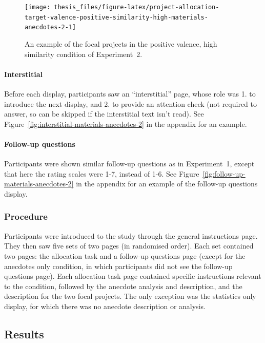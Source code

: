 \documentclass[a4paper, nobind, dvipsnames]{templates/ociamthesis}
\theoremstyle{definition}
\theoremstyle{definition}
\theoremstyle{definition}
\theoremstyle{definition}
\theoremstyle{remark}
\begin{document}
\begin{figure}
\texttt{[image: thesis\_files/figure-latex/project-allocation-target-valence-positive-similarity-high-materials-anecdotes-2-1]} \caption{An example of the focal projects in the positive valence, high similarity condition of Experiment~2.}\label{fig:project-allocation-target-valence-positive-similarity-high-materials-anecdotes-2}
\end{figure}

\paragraph{Interstitial}

Before each display, participants saw an ``interstitial'' page, whose role was 1.
to introduce the next display, and 2. to provide an attention check (not
required to answer, so can be skipped if the interstitial text isn't read). See
Figure~\ref{fig:interstitial-materials-anecdotes-2} in the appendix for an
example.

\paragraph{Follow-up questions}

Participants were shown similar follow-up questions as in Experiment~1, except
that here the rating scales were 1-7, instead of 1-6. See
Figure~\ref{fig:follow-up-materials-anecdotes-2} in the appendix for an example
of the follow-up questions display.

\subsubsection{Procedure}

Participants were introduced to the study through the general instructions page.
They then saw five sets of two pages (in randomised order). Each set contained
two pages: the allocation task and a follow-up questions page (except for the
anecdotes only condition, in which participants did not see the follow-up
questions page). Each allocation task page contained specific instructions
relevant to the condition, followed by the anecdote analysis and description,
and the description for the two focal projects. The only exception was the
statistics only display, for which there was no anecdote description or
analysis.

\subsection{Results}
\end{document}
